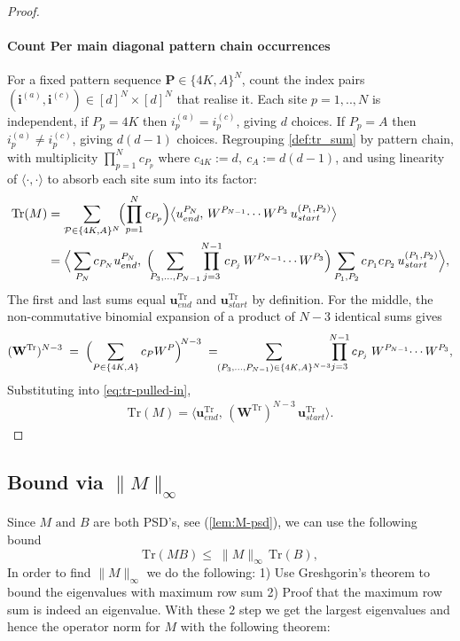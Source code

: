 \documentclass[12pt,a4paper]{article}
\begin{document}
\begin{proof}
\paragraph{Count Per main diagonal pattern chain occurrences}
For a fixed pattern sequence $\boldsymbol{P}\in\{4K,A\}^{N}$, count the index pairs $(\boldsymbol{i}^{(a)},\boldsymbol{i}^{(c)})\in[d]^{N}\times[d]^{N}$ that realise it.
Each site $p=1,..,N$ is independent, if $P_p=4K$ then $i^{(a)}_p=i^{(c)}_p$, giving $d$ choices.
If $P_p=A$ then $i^{(a)}_p\ne i^{(c)}_p$, giving $d(d-1)$ choices. 
Regrouping \eqref{def:tr_sum} by pattern chain, with multiplicity $\prod_{p=1}^{N} c_{P_p}$ where $c_{4K}:=d,\ c_A:=d(d-1)$, and using linearity of $\langle\cdot,\cdot\rangle$ to absorb each site sum into its factor:
\begin{align}
\mathrm{Tr}(M)
&= \sum_{\mathcal{P}\in\{4K,A\}^{N}}\!\Bigl(\prod_{p=1}^{N} c_{P_p}\Bigr)
\bigl\langle u_{end}^{P_N},\, W^{P_{N-1}}\!\cdots W^{P_3}\, u_{start}^{(P_1,P_2)}\bigr\rangle \notag\\
&= \Bigl\langle\, \sum_{P_N} c_{P_N} u_{end}^{P_N},\;
\Bigl(\!\!\sum_{P_3,\ldots,P_{N-1}}\!\prod_{j=3}^{N-1}c_{P_j}\,W^{P_{N-1}}\!\cdots W^{P_3}\Bigr)
\sum_{P_1,P_2} c_{P_1}c_{P_2}\, u_{start}^{(P_1,P_2)} \Bigr\rangle,
\end{align}
The first and last sums equal $\mathbf{u}_{end}^{\mathrm{Tr}}$ and $\mathbf{u}_{start}^{\mathrm{Tr}}$ by definition. For the middle, the non-commutative binomial expansion of a product of $N-3$ identical sums gives
\begin{align}
(\mathbf{W}^{\mathrm{Tr}})^{N-3}
\;=\;\Bigl(\sum_{P\in\{4K,A\}}c_P W^P\Bigr)^{\!N-3}
\;=\!\!\sum_{(P_3,\ldots,P_{N-1})\in\{4K,A\}^{N-3}}\!\!\prod_{j=3}^{N-1}c_{P_j}\;W^{P_{N-1}}\!\cdots W^{P_3},
\end{align}
Substituting into \eqref{eq:tr-pulled-in},
\begin{align}
\mathrm{Tr}(M)=\bigl\langle \mathbf{u}_{end}^{\mathrm{Tr}},\,(\mathbf{W}^{\mathrm{Tr}})^{N-3}\,\mathbf{u}_{start}^{\mathrm{Tr}}\bigr\rangle.
\end{align}

\end{proof}

\subsection{Bound via $\|M\|_{\infty }$}

Since $M \text{ and } B$ are both PSD's, see (\ref{lem:M-psd}), we can use the following bound
\begin{equation}
\mathrm{Tr}(MB)\le\;\|M\|_\infty \,\mathrm{Tr}(B),
\end{equation}
In order to find $\|M\|_\infty$  we do the following:
1) Use Greshgorin's theorem to bound the eigenvalues with maximum row sum
2) Proof that the maximum row sum is indeed an eigenvalue.
With these $2$  step we get the largest eigenvalues and hence the operator norm for $M$ with the following theorem:
\end{document}

